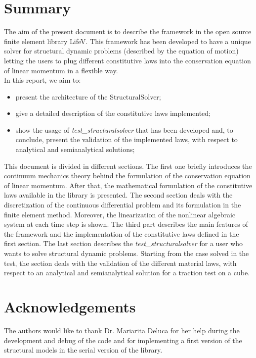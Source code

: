 \documentclass[a4paper, 10pt,twoside]{report}
\theoremstyle{definition} \newtheorem{defn}{Definition}[section]
\theoremstyle{remark} \newtheorem{rmk}{Remark}
\begin{document}
\maketitle


\section*{Summary} The aim of the present document is to describe the
\SSol framework in the open source finite element library LifeV. This
framework has been developed to have a unique solver for structural
dynamic problems (described by the equation of motion) letting the
users to plug different constitutive laws into the conservation
equation of linear momentum in a flexible way.\\ In this report, we
aim to:
\begin{itemize}
  \item present the architecture of the StructuralSolver;
  \item give a detailed description of the constitutive laws
implemented;
  \item show the usage of \textit{test\_structuralsolver} that has
been developed and, to conclude, present the validation of the
implemented laws, with respect to analytical and semianalytical
solutions;
\end{itemize} This document is divided in different sections. The
first one briefly introduces the continuum mechanics theory behind the
formulation of the conservation equation of linear momentum. After
that, the mathematical formulation of the constitutive laws available
in the library is presented. The second section deals with the
discretization of the continuous differential problem and its
formulation in the finite element method. Moreover, the linearization
of the nonlinear algebraic system at each time step is shown. The
third part describes the main features of the \SSol framework and the
implementation of the constitutive laws defined in the first
section. The last section describes the
\textit{test\_structuralsolver} for a user who wants to solve
structural dynamic problems. Starting from the case solved in the
test, the section deals with the validation of the different material
laws, with respect to an analytical and semianalytical solution for a
traction test on a cube.\\

\section*{Acknowledgements} The authors would like to thank
Dr. Mariarita Deluca for her help during the development and debug of
the code and for implementing a first version of the structural models
in the serial version of the library.

\tableofcontents \newpage


 
 

 
\end{document}
